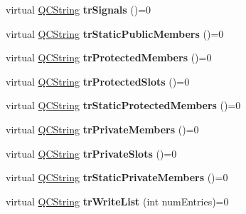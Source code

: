 \begin{DoxyCompactItemize}
\item 
\hypertarget{class_translator_a349d5daf76b488338ddcab76009293b3}{virtual \hyperlink{class_q_c_string}{Q\-C\-String} {\bfseries tr\-Signals} ()=0}\label{class_translator_a349d5daf76b488338ddcab76009293b3}

\item 
\hypertarget{class_translator_afe4adaec8a0d30b078bf62ae19b7dd34}{virtual \hyperlink{class_q_c_string}{Q\-C\-String} {\bfseries tr\-Static\-Public\-Members} ()=0}\label{class_translator_afe4adaec8a0d30b078bf62ae19b7dd34}

\item 
\hypertarget{class_translator_a50116f201c9a1371e8d33e91cda8162d}{virtual \hyperlink{class_q_c_string}{Q\-C\-String} {\bfseries tr\-Protected\-Members} ()=0}\label{class_translator_a50116f201c9a1371e8d33e91cda8162d}

\item 
\hypertarget{class_translator_aa83c847678a6e9b03414f1695f4389f0}{virtual \hyperlink{class_q_c_string}{Q\-C\-String} {\bfseries tr\-Protected\-Slots} ()=0}\label{class_translator_aa83c847678a6e9b03414f1695f4389f0}

\item 
\hypertarget{class_translator_a31be9279d5666e5e58e4f12d4931e1f9}{virtual \hyperlink{class_q_c_string}{Q\-C\-String} {\bfseries tr\-Static\-Protected\-Members} ()=0}\label{class_translator_a31be9279d5666e5e58e4f12d4931e1f9}

\item 
\hypertarget{class_translator_afc930c928857a317a1fd9dcc8d949e6b}{virtual \hyperlink{class_q_c_string}{Q\-C\-String} {\bfseries tr\-Private\-Members} ()=0}\label{class_translator_afc930c928857a317a1fd9dcc8d949e6b}

\item 
\hypertarget{class_translator_a7252543a3b6fb3f642a8c1236fdbdeae}{virtual \hyperlink{class_q_c_string}{Q\-C\-String} {\bfseries tr\-Private\-Slots} ()=0}\label{class_translator_a7252543a3b6fb3f642a8c1236fdbdeae}

\item 
\hypertarget{class_translator_a8926776a1a676ad155c37db94cd35f1c}{virtual \hyperlink{class_q_c_string}{Q\-C\-String} {\bfseries tr\-Static\-Private\-Members} ()=0}\label{class_translator_a8926776a1a676ad155c37db94cd35f1c}

\item 
\hypertarget{class_translator_a13db192a1ffa267eb0557ff67012cc66}{virtual \hyperlink{class_q_c_string}{Q\-C\-String} {\bfseries tr\-Write\-List} (int num\-Entries)=0}\label{class_translator_a13db192a1ffa267eb0557ff67012cc66}


\end{DoxyCompactItemize}
